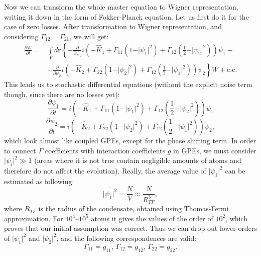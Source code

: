 \documentclass[12pt,notitlepage]{report}
\begin{document}
Now we can transform the whole master equation to Wigner representation, writing it down in the form of Fokker-Planck equation.
Let us first do it for the case of zero losses.
After transformation to Wigner representation, and considering $\Gamma_{12} = \Gamma_{21} $, we will get:
\begin{equation*}
\begin{split}
\frac{\partial W}{\partial t} = & \int\limits_V d\textbf{r} \left\{ - \frac{\partial}{\partial \psi_1} i \left( - \hat{K}_1 + \Gamma_{11} \left( 1 - \vert \psi_1 \vert^2 \right) +
\Gamma_{12} \left( \frac{1}{2} - \vert \psi_2 \vert^2 \right) \right) \psi_1 - \right. \\
& \left. - \frac{\partial}{\partial \psi_2} i \left( - \hat{K}_2 + \Gamma_{22} \left( 1 - \vert \psi_2 \vert^2 \right) +
\Gamma_{12} \left( \frac{1}{2} - \vert \psi_1 \vert^2 \right) \right) \psi_2 \right\} W +
\textrm{c.c.}
\end{split}
\end{equation*}
This leads us to stochastic differential equations (without the explicit noise term though, since there are no losses yet):
\[
\frac{\partial \psi_1}{\partial t} = i \left( - \hat{K}_1 + \Gamma_{11} \left( 1 - \vert \psi_1 \vert^2 \right) +
\Gamma_{12} \left( \frac{1}{2} - \vert \psi_2 \vert^2 \right) \right) \psi_1
\]
\[
\frac{\partial \psi_2}{\partial t} = i \left( - \hat{K}_2 + \Gamma_{22} \left( 1 - \vert \psi_2 \vert^2 \right) +
\Gamma_{12} \left( \frac{1}{2} - \vert \psi_1 \vert^2 \right) \right) \psi_2,
\]
which look almost like coupled GPEs, except for the phase shifting term.
In order to connect $\Gamma$ coefficients with interaction coefficients $g$ in GPEs,
we must consider $\vert \psi_i \vert^2 \gg 1$
(areas where it is not true contain negligible amounts of atoms and therefore do not affect the evolution).
Really, the average value of $\vert \psi_1 \vert^2$ can be estimated as following:
\[
\bar{\vert \psi_1 \vert^2} = \frac{N}{V} \approx \frac{N}{R_{TF}^3},
\]
where $R_{TF}$ is the radius of the condensate, obtained using Thomas-Fermi approximation.
For $10^4$--$10^5$ atoms it gives the values of the order of $10^2$, which proves that our initial assumption was correct.
Thus we can drop out lower orders of $\vert \psi_1 \vert^2$ and $\vert \psi_2 \vert^2$, and the following correspondences are valid:
\[
\Gamma_{11} = g_{11},\, \Gamma_{12} = g_{12},\, \Gamma_{22} = g_{22}.
\]
\end{document}

